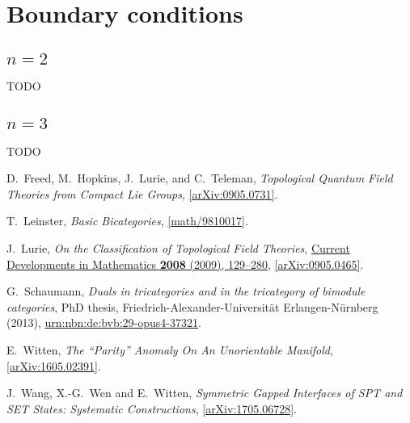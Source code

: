 \documentclass[12pt]{scrartcl}
\newcommand\arxiv[2]      {\href{http://arXiv.org/abs/#1}{#2}}
\theoremstyle{definition}
\numberwithin{equation}{section}
\numberwithin{definition}{section}
\numberwithin{figure}{section}
\begin{document}
\section{Boundary conditions}

\subsection{$n=2$}

TODO

\subsection{$n=3$}

TODO






\begin{thebibliography}{BDSPV}

D.~Freed, M.~Hopkins, J.~Lurie, and C.~Teleman,
\textsl{Topological Quantum Field Theories from Compact Lie Groups}, 
\href{http://arxiv.org/abs/0905.0731}{[\mbox{arXiv:}0905.0731]}. 

T.~Leinster, 
\textsl{Basic Bicategories}, 
\href{http://arxiv.org/abs/math/9810017}{[math/9810017]}.

J.~Lurie, 
\textsl{On the Classification of Topological Field Theories},
\href{https://projecteuclid.org/euclid.cdm/1254748657}{Current Developments in Mathematics \textbf{2008} (2009), 129--280}, 
\arxiv{0905.0465}{[arXiv:0905.0465]}.

G.~Schaumann, 
\textsl{Duals in tricategories and in the tricategory of bimodule categories}, 
PhD thesis, 
Friedrich-Alexander-Universit\"at Erlangen-N\"urnberg (2013), 
\href{http://nbn-resolving.de/urn/resolver.pl?urn:nbn:de:bvb:29-opus4-37321}{urn:nbn:de:bvb:29-opus4-37321}.

E.~Witten, 
\textsl{The ``Parity'' Anomaly On An Unorientable Manifold}, 
\href{http://arxiv.org/abs/1605.02391}{[arXiv:1605.02391]}.  

J.~Wang, X.-G.~Wen and E.~Witten, 
\textsl{Symmetric Gapped Interfaces of SPT and SET States: Systematic Constructions}, 
\href{http://arxiv.org/abs/1705.06728}{[arXiv:1705.06728]}.  






\end{thebibliography}
\end{document}
